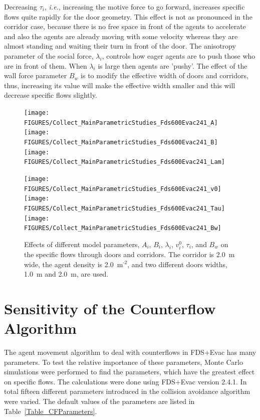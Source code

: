 \documentclass[12pt,a4paper,final,twoside]{stylevk}
\begin{document}
Decreasing $\tau_i$, \emph{i.e.}, increasing the motive force to go
forward, increases specific flows quite rapidly for the door geometry.
This effect is not as pronounced in the corridor case, because there
is no free space in front of the agents to accelerate and also the
agents are already moving with some velocity whereas they are almost
standing and waiting their turn in front of the door.  The anisotropy
parameter of the social force, $\lambda_i$, controls how eager agents
are to push those who are in front of them.  When $\lambda_i$ is large
then agents are 'pushy'.  The effect of the wall force parameter $B_w$
is to modify the effective width of doors and corridors, thus,
increasing its value will make the effective width smaller and this
will decrease specific flows slightly.

%
\begin{figure}[!tb]
  \centerline{ \texttt{[image: FIGURES/Collect\_MainParametricStudies\_Fds600Evac241\_A]}  
  \texttt{[image: FIGURES/Collect\_MainParametricStudies\_Fds600Evac241\_B]} 
  \texttt{[image: FIGURES/Collect\_MainParametricStudies\_Fds600Evac241\_Lam]} }  
  \centerline{ \texttt{[image: FIGURES/Collect\_MainParametricStudies\_Fds600Evac241\_v0]}  
  \texttt{[image: FIGURES/Collect\_MainParametricStudies\_Fds600Evac241\_Tau]} 
  \texttt{[image: FIGURES/Collect\_MainParametricStudies\_Fds600Evac241\_Bw]} }
  \caption{Effects of different model parameters, $A_i$, $B_i$,
    $\lambda_i$, $v^0_i$, $\tau_i$, and $B_w$ on the specific flows
    through doors and corridors.  The corridor is 2.0~m wide, the
    agent density is 2.0~$\mathrm{ \textrm{m}^\textrm{-2} }$, and two
    different doors widths, 1.0~m and 2.0~m, are used.
    \protect\hspace{200mm}}\label{Fig_Door1}
\end{figure}
%


\section{Sensitivity of the Counterflow Algorithm}\label{Sec_CFSensi}

\noindent The agent movement algorithm to deal with counterflows in
FDS+Evac has many parameters.  To test the relative importance of
these parameters, Monte Carlo simulations were performed to find the
parameters, which have the greatest effect on specific flows.  The
calculations were done using FDS+Evac version 2.4.1.  In total fifteen
different parameters introduced in the collision avoidance algorithm
were varied.  The default values of the parameters are listed in
Table~\ref{Table_CFParameters}.
\end{document}
